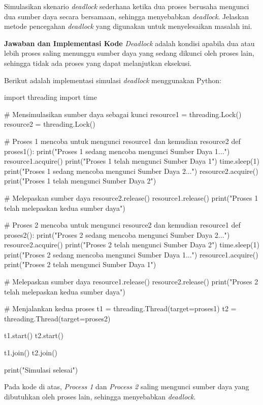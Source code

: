 \documentclass[12pt]{article}
\begin{document}
Simulasikan skenario \textit{deadlock} sederhana ketika dua proses berusaha mengunci dua sumber daya secara bersamaan, sehingga menyebabkan \textit{deadlock}. Jelaskan metode pencegahan \textit{deadlock} yang digunakan untuk menyelesaikan masalah ini.

\textbf{Jawaban dan Implementasi Kode}
\vspace{0.5cm}
\textit{Deadlock} adalah kondisi apabila dua atau lebih proses saling menunggu sumber daya yang sedang dikunci oleh proses lain, sehingga tidak ada proses yang dapat melanjutkan eksekusi.

Berikut adalah implementasi simulasi \textit{deadlock} menggunakan Python:

\begin{python}  
import threading
import time

# Mensimulasikan sumber daya sebagai kunci
resource1 = threading.Lock()
resource2 = threading.Lock()

# Proses 1 mencoba untuk mengunci resource1 dan kemudian resource2
def proses1():
    print("Proses 1 sedang mencoba mengunci Sumber Daya 1...")
    resource1.acquire()
    print("Proses 1 telah mengunci Sumber Daya 1")
    time.sleep(1)
    print("Proses 1 sedang mencoba mengunci Sumber Daya 2...")
    resource2.acquire()
    print("Proses 1 telah mengunci Sumber Daya 2")
    
    # Melepaskan sumber daya
    resource2.release()
    resource1.release()
    print("Proses 1 telah melepaskan kedua sumber daya")

# Proses 2 mencoba untuk mengunci resource2 dan kemudian resource1
def proses2():
    print("Proses 2 sedang mencoba mengunci Sumber Daya 2...")
    resource2.acquire()
    print("Proses 2 telah mengunci Sumber Daya 2")
    time.sleep(1)
    print("Proses 2 sedang mencoba mengunci Sumber Daya 1...")
    resource1.acquire()
    print("Proses 2 telah mengunci Sumber Daya 1")
    
    # Melepaskan sumber daya
    resource1.release()
    resource2.release()
    print("Proses 2 telah melepaskan kedua sumber daya")

# Menjalankan kedua proses
t1 = threading.Thread(target=proses1)
t2 = threading.Thread(target=proses2)

t1.start()
t2.start()

t1.join()
t2.join()

print("Simulasi selesai")
\end{python}

Pada kode di atas, \textit{Process 1} dan \textit{Process 2} saling mengunci sumber daya yang dibutuhkan oleh proses lain, sehingga menyebabkan \textit{deadlock}.
\end{document}
